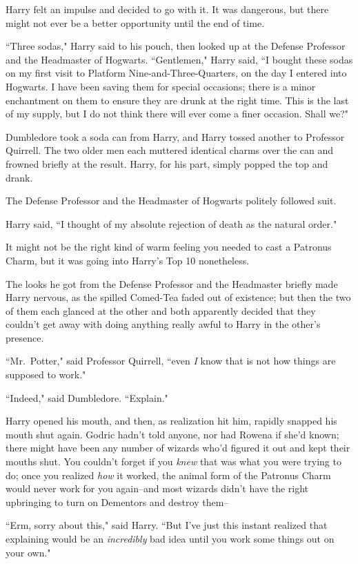 Harry felt an impulse and decided to go with it. It was dangerous, but there might not ever be a better opportunity until the end of time.

``Three sodas," Harry said to his pouch, then looked up at the Defense Professor and the Headmaster of Hogwarts. ``Gentlemen," Harry said, ``I bought these sodas on my first visit to Platform Nine-and-Three-Quarters, on the day I entered into Hogwarts. I have been saving them for special occasions; there is a minor enchantment on them to ensure they are drunk at the right time. This is the last of my supply, but I do not think there will ever come a finer occasion. Shall we?"

Dumbledore took a soda can from Harry, and Harry tossed another to Professor Quirrell. The two older men each muttered identical charms over the can and frowned briefly at the result. Harry, for his part, simply popped the top and drank.

The Defense Professor and the Headmaster of Hogwarts politely followed suit.

Harry said, ``I thought of my absolute rejection of death as the natural order."

It might not be the right kind of warm feeling you needed to cast a Patronus Charm, but it was going into Harry's Top 10 nonetheless.

The looks he got from the Defense Professor and the Headmaster briefly made Harry nervous, as the spilled Comed-Tea faded out of existence; but then the two of them each glanced at the other and both apparently decided that they couldn't get away with doing anything really awful to Harry in the other's presence.

``Mr.~Potter," said Professor Quirrell, ``even \emph{I} know that is not how things are supposed to work."

``Indeed," said Dumbledore. ``Explain."

Harry opened his mouth, and then, as realization hit him, rapidly snapped his mouth shut again. Godric hadn't told anyone, nor had Rowena if she'd known; there might have been any number of wizards who'd figured it out and kept their mouths shut. You couldn't forget if you \emph{knew} that was what you were trying to do; once you realized \emph{how} it worked, the animal form of the Patronus Charm would never work for you again\---and most wizards didn't have the right upbringing to turn on Dementors and destroy them\---

``Erm, sorry about this," said Harry. ``But I've just this instant realized that explaining would be an \emph{incredibly} bad idea until you work some things out on your own."

